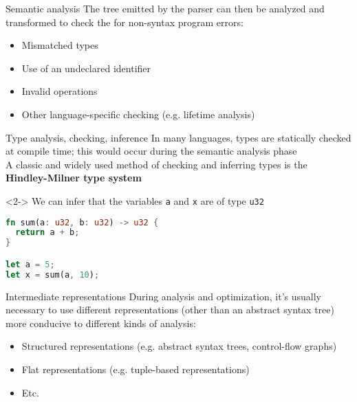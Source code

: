 \documentclass[../index.tex]{subfiles}
\begin{document}
\renewcommand{\sectiontitle}{Semantic analysis}
\renewcommand{\currenttitle}{\sectiontitle}
\begin{frame}[fragile]{\currenttitle}
  The tree emitted by the parser can then be analyzed and transformed to check
  the for non-syntax program errors:

  \begin{itemize}
    \item Mismatched types
    \item Use of an undeclared identifier
    \item Invalid operations
    \item Other language-specific checking (e.g. lifetime analysis)
  \end{itemize}
\end{frame}
  
\renewcommand{\currenttitle}{Type analysis, checking, inference}
\begin{frame}[fragile]{\currenttitle}
  In many languages, types are statically checked at compile time; this would
  occur during the semantic analysis phase \\[2em]

  A classic and widely used method of checking and inferring types is the
  \textbf{Hindley-Milner type system}

  \begin{onlyenv}<2->
    We can infer that the variables \texttt{a} and \texttt{x} are of type
    \texttt{u32} 

    \begin{lstlisting}[language=Rust, xleftmargin=5mm]
fn sum(a: u32, b: u32) -> u32 {
  return a + b;
}

let a = 5;
let x = sum(a, 10);
    \end{lstlisting}
  \end{onlyenv}
\end{frame}
  
\renewcommand{\currenttitle}{Intermediate representations}
\begin{frame}[fragile]{\currenttitle}
  During analysis and optimization, it's usually necessary to use different
  representations (other than an abstract syntax tree) more conducive to
  different kinds of analysis:

  \begin{itemize}
    \item<2-> Structured representations (e.g. abstract syntax trees, control-flow
      graphs)
    \item<3-> Flat representations (e.g. tuple-based representations)
    \item<4-> Etc.
  \end{itemize}

\end{frame}
  
\end{document}
